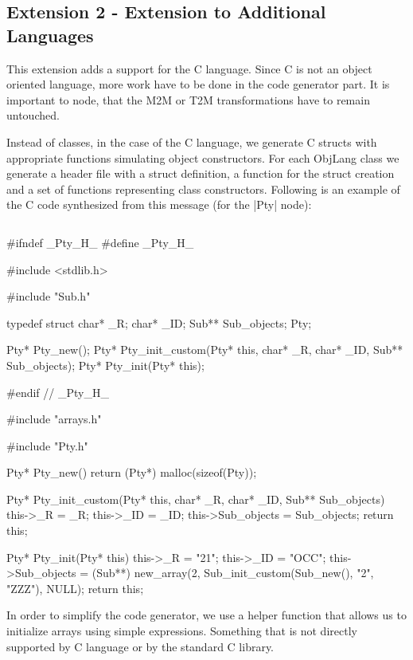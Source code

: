\subsection{Extension 2 - Extension to Additional Languages}
\label{sec:Extension2}

This extension adds a support for the C language.
Since C is not an object oriented language, more work have to be done in the code generator part.
It is important to node, that the M2M or T2M transformations have to remain untouched.

Instead of classes, in the case of the C language, we generate C structs with appropriate functions simulating object constructors.
For each ObjLang class we generate a header file with a struct definition, a function for the struct creation and a set of functions representing class constructors.
Following is an example of the C code synthesized from this \FIXML message (for the \Scala|Pty| node):
%
\inputminted[fontsize=\fontsize{8}{8},linenos,numbersep=5pt,frame=lines,framesep=2mm]{xml}{listings/example-for-c-code.xml}
%
\begin{ccode}
#ifndef _Pty_H_
#define _Pty_H_

#include <stdlib.h>

#include "Sub.h"

typedef struct {
  char* _R;
  char* _ID;
  Sub** Sub_objects;
} Pty;

Pty* Pty_new();
Pty* Pty_init_custom(Pty* this, char* _R, char* _ID, Sub** Sub_objects);
Pty* Pty_init(Pty* this);

#endif // _Pty_H_	
\end{ccode}
%
\begin{ccode}
#include "arrays.h"

#include "Pty.h"

Pty* Pty_new() {
  return (Pty*) malloc(sizeof(Pty));
}

Pty* Pty_init_custom(Pty* this, char* _R, char* _ID, Sub** Sub_objects) {
  this->_R = _R;
  this->_ID = _ID;
  this->Sub_objects = Sub_objects;
  return this;
}

Pty* Pty_init(Pty* this) {
  this->_R = "21";
  this->_ID = "OCC";
  this->Sub_objects = (Sub**) new_array(2, Sub_init_custom(Sub_new(), "2", "ZZZ"), NULL);
  return this;
}
\end{ccode}

In order to simplify the code generator, we use a helper function  that allows us to initialize arrays using simple expressions.
Something that is not directly supported by C language or by the standard C library.

